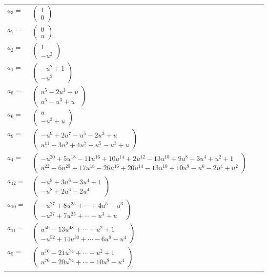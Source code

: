 \documentclass[1p]{elsarticle_modified}
\theoremstyle{definition}
\begin{document}
\begin{tabular}{m{7pt} m{180pt} m{7pt} m{180pt} }
\flushright $a_{3}=$&$\begin{pmatrix}1\\0\end{pmatrix}$ \\
\flushright $a_{7}=$&$\begin{pmatrix}0\\u\end{pmatrix}$ \\
\flushright $a_{2}=$&$\begin{pmatrix}1\\- u^2\end{pmatrix}$ \\
\flushright $a_{1}=$&$\begin{pmatrix}- u^2+1\\- u^2\end{pmatrix}$ \\
\flushright $a_{8}=$&$\begin{pmatrix}u^5-2 u^3+u\\u^5- u^3+u\end{pmatrix}$ \\
\flushright $a_{6}=$&$\begin{pmatrix}u\\- u^3+u\end{pmatrix}$ \\
\flushright $a_{9}=$&$\begin{pmatrix}- u^9+2 u^7- u^5-2 u^3+u\\u^{11}-3 u^9+4 u^7- u^5- u^3+u\end{pmatrix}$ \\
\flushright $a_{4}=$&$\begin{pmatrix}- u^{20}+5 u^{18}-11 u^{16}+10 u^{14}+2 u^{12}-13 u^{10}+9 u^8-3 u^4+u^2+1\\u^{22}-6 u^{20}+17 u^{18}-26 u^{16}+20 u^{14}-13 u^{10}+10 u^8- u^6-2 u^4+u^2\end{pmatrix}$ \\
\flushright $a_{12}=$&$\begin{pmatrix}- u^8+3 u^6-3 u^4+1\\- u^8+2 u^6-2 u^4\end{pmatrix}$ \\
\flushright $a_{10}=$&$\begin{pmatrix}- u^{27}+8 u^{25}+\cdots+4 u^5- u^3\\- u^{27}+7 u^{25}+\cdots- u^3+u\end{pmatrix}$ \\
\flushright $a_{11}=$&$\begin{pmatrix}u^{50}-13 u^{48}+\cdots+u^2+1\\- u^{52}+14 u^{50}+\cdots-6 u^8- u^4\end{pmatrix}$ \\
\flushright $a_{5}=$&$\begin{pmatrix}u^{76}-21 u^{74}+\cdots+u^2+1\\u^{76}-20 u^{74}+\cdots+10 u^8- u^4\end{pmatrix}$\\&\end{tabular}
\end{document}
